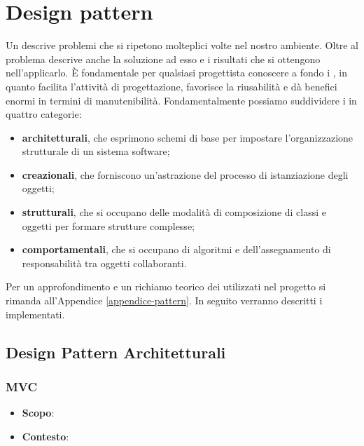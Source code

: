 \section{Design pattern}

Un  descrive problemi che si ripetono molteplici volte nel nostro ambiente. Oltre al problema descrive anche la soluzione ad esso e i risultati che si ottengono nell'applicarlo. È fondamentale per qualsiasi progettista conoscere a fondo i , in quanto facilita l'attività di progettazione, favorisce la riusabilità e dà benefici enormi in termini di manutenibilità. Fondamentalmente possiamo suddividere i  in quattro categorie:

\begin{itemize}

	\item \textbf{ architetturali}, che esprimono schemi di base per impostare l'organizzazione strutturale di un sistema software;
	\item \textbf{ creazionali}, che forniscono un'astrazione del processo di istanziazione degli oggetti;
	\item \textbf{ strutturali}, che si occupano delle modalità di composizione di classi e oggetti per formare strutture complesse; 
	\item \textbf{ comportamentali}, che si occupano di algoritmi e dell'assegnamento di responsabilità tra oggetti collaboranti.

\end{itemize}

Per un approfondimento e un richiamo teorico dei  utilizzati nel progetto  si rimanda all'Appendice \ref{appendice-pattern}. In seguito verranno descritti i  implementati.

\subsection{Design Pattern Architetturali}

\subsubsection{MVC}

\begin{itemize}

	\item \textbf{Scopo}:
	\item \textbf{Contesto}: 

\end{itemize}

